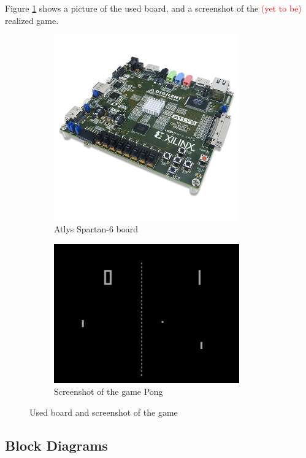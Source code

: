 \documentclass[12pt]{article}
\begin{document}
	Figure \ref{board+screenshot} shows a picture of the used board, and a screenshot of the \textcolor{red}{(yet to be)} realized game. 
	
	\begin{figure}[h]
		\begin{subfigure}[b]{.4\textwidth}
			\includegraphics[width=8cm]{images/atlys_pic.png}
			\caption{Atlys Spartan-6 board}
		\end{subfigure}
		\hfill
		\begin{subfigure}[b]{.4\textwidth}
			\includegraphics[width=8cm]{images/pong_screenshot.png}		
			\caption{Screenshot of the game Pong}
		\end{subfigure}
		
	\caption{Used board and screenshot of the game}
	\label{board+screenshot}
	\end{figure}
	
	
	\subsection{Block Diagrams}
\end{document}
